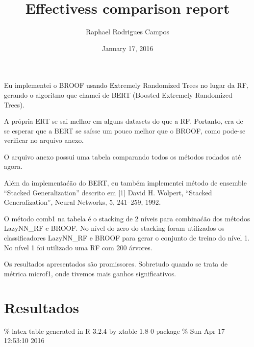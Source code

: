 \documentclass[]{article}
\title{Effectivess comparison report}
\author{Raphael Rodrigues Campos}
\date{January 17, 2016}
\begin{document}
\maketitle


Eu implementei o BROOF usando Extremely Randomized Trees no lugar da RF,
gerando o algoritmo que chamei de BERT (Boosted Extremely Randomized
Trees).

A própria ERT se sai melhor em alguns datasets do que a RF. Portanto,
era de se esperar que a BERT se saísse um pouco melhor que o BROOF, como
pode-se verificar no arquivo anexo.

O arquivo anexo possui uma tabela comparando todos os métodos rodados
até agora.

Além da implementaćão do BERT, eu também implementei método de ensemble
``Stacked Generalization'' descrito em {[}1{]} David H. Wolpert,
``Stacked Generalization'', Neural Networks, 5, 241--259, 1992.

O método comb1 na tabela é o stacking de 2 níveis para combinaćão dos
métodos LazyNN\_RF e BROOF. No nível do zero do stacking foram
utilizados os classificadores LazyNN\_RF e BROOF para gerar o conjunto
de treino do nível 1. No nível 1 foi utilizado uma RF com 200 árvores.

Os resultados apresentados são promissores. Sobretudo quando se trata de
métrica microf1, onde tivemos mais ganhos significativos.

\section{Resultados}\label{resultados}

\% latex table generated in R 3.2.4 by xtable 1.8-0 package \% Sun Apr
17 12:53:10 2016
\end{document}

